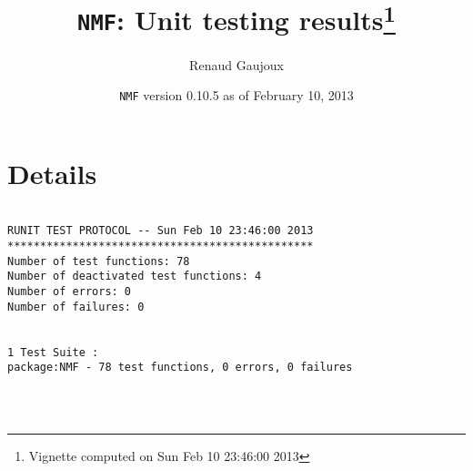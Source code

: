 \documentclass[10pt]{article}
\author{Renaud Gaujoux}
\title{\texttt{NMF}: Unit testing results\footnote{Vignette computed  on Sun Feb 10 23:46:00 2013}}
\date{\texttt{NMF} version 0.10.5 as of February 10, 2013}
\begin{document}
\maketitle

\section{Details}
\begin{verbatim}

RUNIT TEST PROTOCOL -- Sun Feb 10 23:46:00 2013 
*********************************************** 
Number of test functions: 78 
Number of deactivated test functions: 4 
Number of errors: 0 
Number of failures: 0 

 
1 Test Suite : 
package:NMF - 78 test functions, 0 errors, 0 failures




\end{verbatim}
\end{document}

